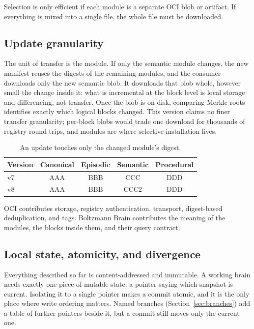 \documentclass[11pt,a4paper]{article}
\begin{document}
\begin{callout}[title=Necessary condition]
Selection is only efficient if each module is a separate OCI blob or artifact.
If everything is mixed into a single file, the whole file must be downloaded.
\end{callout}

\subsection{Update granularity}

The unit of transfer is the module. If only
the semantic module changes, the new manifest reuses the digests of the
remaining modules, and the consumer downloads only the new semantic blob. It
downloads that blob whole, however small the change inside it: what is
incremental at the block level is local storage and differencing, not
transfer. Once the blob is on disk, comparing Merkle roots identifies exactly
which logical blocks changed. This version claims no finer transfer
granularity; per-block blobs would trade one download for thousands of
registry round-trips, and modules are where selective installation lives.

\begin{table}[htbp]
\centering
\caption{An update touches only the changed module's digest.}
\label{tab:incremental}
\begin{tabular}{lcccc}
\toprule
\textbf{Version} & \textbf{Canonical} & \textbf{Episodic} & \textbf{Semantic} & \textbf{Procedural} \\
\midrule
v7 & AAA & BBB & CCC  & DDD \\
v8 & AAA & BBB & CCC2 & DDD \\
\bottomrule
\end{tabular}
\end{table}

OCI contributes storage, registry authentication, transport, digest-based
deduplication, and tags. Boltzmann Brain contributes the meaning of the
modules, the blocks inside them, and their query contract.

\subsection{Local state, atomicity, and divergence}
\label{sec:local-state}

Everything described so far is content-addressed and immutable. A working brain needs exactly one piece of mutable state: a pointer saying
which snapshot is current. Isolating it to a single pointer makes a commit atomic, and it is the only
place where write ordering matters. Named branches (Section~\ref{sec:branches})
add a table of further pointers beside it, but a commit still moves only the
current one.
\end{document}
